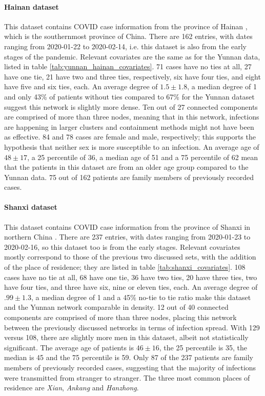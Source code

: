 \documentclass{article}
\begin{document}
	\paragraph{Hainan dataset} This dataset contains COVID case information from the province of Hainan \cite{hainan_data}, which is the southernmost province of China. There are 162 entries, with dates ranging from 2020-01-22 to 2020-02-14, i.e. this dataset is also from the early stages of the pandemic. Relevant covariates are the same as for the Yunnan data, listed in table \ref{tab:yunnan_hainan_covariates}. 71 cases have no ties at all, 27 have one tie, 21 have two and three ties, respectively, six have four ties, and eight have five and six ties, each. An average degree of $1.5\pm1.8$, a median degree of 1 and only 43\% of patients without ties compared to 67\% for the Yunnan dataset suggest this network is slightly more dense. Ten out of 27 connected components are comprised of more than three nodes, meaning that in this network, infections are happening in larger clusters and containment methods might not have been as effective. 84 and 78 cases are female and male, respectively; this supports the hypothesis that neither sex is more susceptible to an infection. An average age of $48\pm17$, a 25 percentile of 36, a median age of 51 and a 75 percentile of 62 mean that the patients in this dataset are from an older age group compared to the Yunnan data. 75 out of 162 patients are family members of previously recorded cases.
	
	\paragraph{Shanxi dataset} This dataset contains COVID case information from the province of Shanxi in northern China \cite{shanxi_data}. There are 237 entries, with dates ranging from 2020-01-23 to 2020-02-16, so this dataset too is from the early stages. Relevant covariates mostly correspond to those of the previous two discussed sets, with the addition of the place of residence; they are listed in table \ref{tab:shanxi_covariates}. 108 cases have no tie at all, 68 have one tie, 36 have two ties, 20 have three ties, two have four ties, and three have six, nine or eleven ties, each. An average degree of $.99\pm1.3$, a median degree of 1 and a 45\% no-tie to tie ratio make this dataset and the Yunnan network comparable in density. 12 out of 40 connected components are comprised of more than three nodes, placing this network between the previously discussed networks in terms of infection spread. With 129 versus 108, there are slightly more men in this dataset, albeit not statistically significant. The average age of patients is $46\pm16$, the 25 percentile is 35, the median is 45 and the 75 percentile is 59. Only 87 of the 237 patients are family members of previously recorded cases, suggesting that the majority of infections were transmitted from stranger to stranger. The three most common places of residence are \emph{Xian}, \emph{Ankang} and \emph{Hanzhong}.
	
\end{document}
